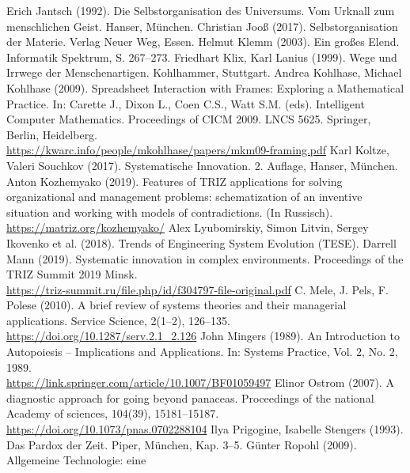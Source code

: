 \documentclass[11pt,a4paper]{article}
\begin{document}
\begin{thebibliography}{xxx}
 Erich Jantsch (1992). Die Selbstorganisation des
  Universums. Vom Urknall zum menschlichen Geist.  Hanser, München.
 Christian Jooß (2017). Selbstorganisation der Materie.
  Verlag Neuer Weg, Essen.
 Helmut Klemm (2003). Ein großes Elend. Informatik
  Spektrum, S. 267--273.
 Friedhart Klix, Karl Lanius (1999). Wege und Irrwege der
  Menschenartigen.  Kohlhammer, Stuttgart.
 Andrea Kohlhase, Michael Kohlhase (2009). Spreadsheet
  Interaction with Frames: Exploring a Mathematical Practice. In: Carette J.,
  Dixon L., Coen C.S., Watt S.M. (eds). Intelligent Computer
  Mathematics. Proceedings of CICM 2009.  LNCS 5625. Springer, Berlin,
  Heidelberg.\\
  \url{https://kwarc.info/people/mkohlhase/papers/mkm09-framing.pdf}
 Karl Koltze, Valeri Souchkov (2017). Systematische
  Innovation.  2. Auf\-lage, Hanser, München.
 Anton Kozhemyako (2019). Features of TRIZ
  applications for solving organizational and management problems:
  schematization of an inventive situation and working with models of
  contradictions. (In Russisch).\\ \url{https://matriz.org/kozhemyako/}
 Alex Lyubomirskiy, Simon Litvin, Sergey Ikovenko et al.
  (2018).  Trends of Engineering System Evolution (TESE).
 Darrell Mann (2019).  Systematic innovation in complex
  environments. Proceedings of the TRIZ Summit 2019 Minsk.\\
  \url{https://triz-summit.ru/file.php/id/f304797-file-original.pdf} 
 C. Mele, J. Pels, F. Polese (2010). A brief review of
  systems theories and their managerial applications. Service Science,
  2(1--2), 126--135.\\ \url{https://doi.org/10.1287/serv.2.1_2.126} 
 John Mingers (1989). An Introduction to Autopoiesis --
  Implications and Applications. In: Systems Practice, Vol. 2, No. 2,
  1989.\\ \url{https://link.springer.com/article/10.1007/BF01059497}
 Elinor Ostrom (2007). A diagnostic approach for going
  beyond panaceas.  Proceedings of the national Academy of sciences, 104(39),
  15181--15187.\\ \url{https://doi.org/10.1073/pnas.0702288104}
 Ilya Prigogine, Isabelle Stengers (1993). Das Pardox
  der Zeit. Piper, München, Kap. 3--5.
 Günter Ropohl (2009). Allgemeine Technologie: eine

\end{thebibliography}
\end{document}
